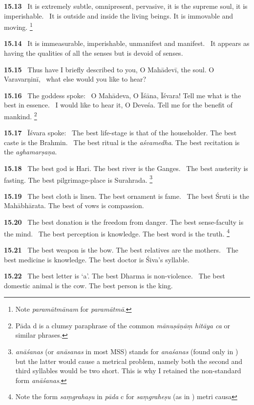 \documentclass{article}
\newcommand{\skt}[1]{\textit{#1}}
\begin{document}
\textbf{15.13}%
\ It is extremely subtle, omnipresent, pervasive, it is the supreme soul, it is imperishable.%
\              It is outside and inside the living beings. It is immovable and moving.%
\footnote{Note \skt{paramātmānam} for \skt{paramātmā}. }%


\textbf{15.14}%
\ It is immeasurable, imperishable, unmanifest and manifest.%
\                  It appears as having the qualities of all the senses but is devoid of senses.%


\textbf{15.15}%
\ Thus have I briefly described to you, O Mahādevī, the soul. O Varavarṇinī,%
\                 what else would you like to hear?%


\textbf{15.16}%
\ The goddess spoke:%
\ O Mahādeva, O Īśāna, Īśvara! Tell me what is the best in essence.%
\                 I would like to hear it, O Deveśa. Tell me for the benefit of mankind.%
\footnote{Pāda d is a clumsy paraphrase of the common \skt{mānuṣāṇāṃ hitāya ca} or similar phrases. }%


\textbf{15.17}%
\ Īśvara spoke:%
\ The best life-stage is that of the householder. The best caste is the Brahmin.%
\                   The best ritual is the \skt{aśvamedha}. The best recitation is the \skt{aghamarṣaṇa}.%


\textbf{15.18}%
\ The best god is Hari. The best river is the Ganges.%
\                   The best austerity is fasting. The best pilgrimage-place is Surahrada.%
\footnote{\skt{anāśanas} (or \skt{anāsanas} in most MSS) stands for \skt{anaśanas} (found only in \msNc) but the latter would cause                 a metrical problem, namely both the second and third syllables would be two short. This is why I retained                        the non-standard form \skt{anāśanas}. }%


\textbf{15.19}%
\ The best cloth is linen. The best ornament is fame.%
\                  The best Śruti is the Mahābhārata. The best of vows is compassion.%


\textbf{15.20}%
\ The best donation is the freedom from danger. The best sense-faculty is the mind.%
\                  The best perception is knowledge. The best word is the truth.%
\footnote{Note the form \skt{saṃgrahaṣu} in \skt{pāda} c for \skt{saṃgraheṣu} (as in \msNc) metri causa }%


\textbf{15.21}%
\ The best weapon is the bow. The best relatives are the mothers.%
\                  The best medicine is knowledge. The best doctor is Śiva's syllable.%


\textbf{15.22}%
\ The best letter is `a'. The best Dharma is non-violence.%
\                  The best domestic animal is the cow. The best person is the king.%
\end{document}
